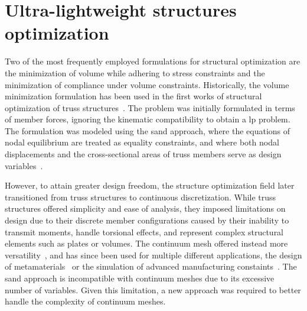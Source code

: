 



\section{Ultra-lightweight structures optimization}
Two of the most frequently employed formulations for structural optimization are the minimization of volume while adhering to stress constraints and the minimization of compliance under volume constraints. Historically, the volume minimization formulation has been used in the first works of structural optimization of truss structures~. The problem was initially formulated in terms of member forces, ignoring the kinematic compatibility to obtain a \gls{lp} problem. The formulation was modeled using the \acrfull{sand} approach, where the equations of nodal equilibrium are treated as equality constraints, and where both nodal displacements and the cross-sectional areas of truss members serve as design variables~. 

However, to attain greater design freedom, the structure optimization field later transitioned from truss structures to continuous discretization. While truss structures offered simplicity and ease of analysis, they imposed limitations on design due to their discrete member configurations caused by their inability to transmit moments, handle torsional effects, and represent complex structural elements such as plates or volumes. The continuum mesh offered instead more versatility~, and has since been used for multiple different applications, \eg the design of metamaterials~ or the simulation of advanced manufacturing constaints~. The \gls{sand} approach is incompatible with continuum meshes due to its excessive number of variables. Given this limitation, a new approach was required to better handle the complexity of continuum meshes.

